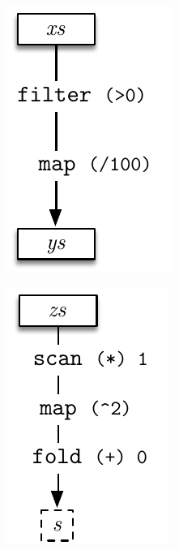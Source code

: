 \documentclass[preamble.tex]{subfiles}
\begin{document}
\begin{figure}

\begin{subfigure}{.33\textwidth}%
\includegraphics[center,scale=0.85]{img/simple-pipeline-a}%
\end{subfigure}%
\begin{subfigure}{.33\textwidth}%
\includegraphics[center,scale=0.85]{img/simple-pipeline-b}%
\end{subfigure}%
\begin{subfigure}{.33\textwidth}%

\end{subfigure}
\end{figure}
\end{document}
